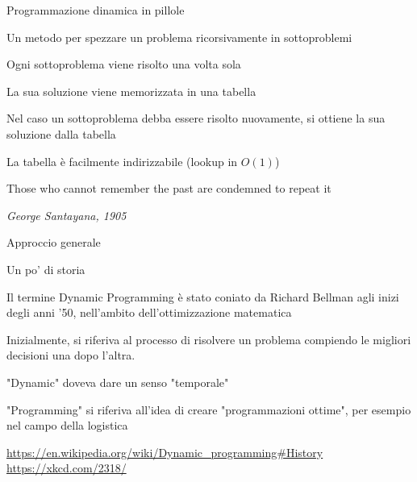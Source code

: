 \begin{frame}{Programmazione dinamica in pillole}

\BIL
\item Un metodo per spezzare un problema ricorsivamente in sottoproblemi
\item Ogni sottoproblema viene risolto una volta sola
\item La sua soluzione viene memorizzata in una tabella
\item Nel caso un sottoproblema debba essere risolto nuovamente, si ottiene la
  sua soluzione dalla tabella
\item La tabella è facilmente indirizzabile (lookup in $O(1)$)
\EIL
    
\epigraph{\alert{Those who cannot remember the past are condemned to repeat it}
}{\textit{George Santayana, 1905}}

\end{frame}




\begin{frame}{Approccio generale}

\vspace{-9pt}

\end{frame}

\begin{frame}{Un po' di storia}

\begin{overprint}
\BIL
\item Il termine \alert{Dynamic Programming} è stato coniato da Richard Bellman 
agli inizi degli anni '50, nell'ambito dell'ottimizzazione matematica   
\item Inizialmente, si riferiva al processo di risolvere un problema compiendo
le migliori decisioni una dopo l'altra.
\item "Dynamic" doveva dare un senso "temporale"
\item "Programming" si riferiva all'idea di creare "programmazioni ottime",
per esempio nel campo della logistica
\EIL

\bigskip
\url{https://en.wikipedia.org/wiki/Dynamic_programming\#History}
\vspace{-12pt}
\small
\url{https://xkcd.com/2318/}
\end{overprint}
\end{frame}



